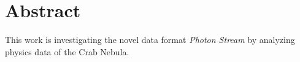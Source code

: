\chapter{Abstract}

This work is investigating the novel data format \textit{Photon Stream} by
analyzing physics data of the Crab Nebula.
